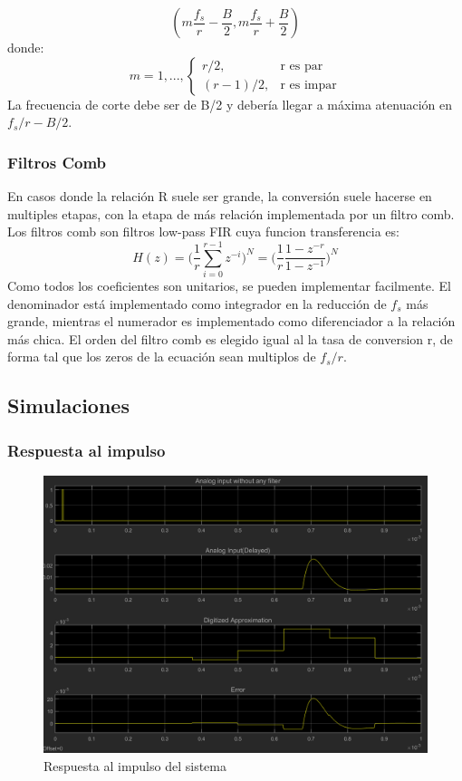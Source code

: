 \documentclass[assd_tp3_main.tex]{subfiles}
\begin{document}
\[ (m\frac{f_s}{r}-\frac{B}{2},m\frac{f_s}{r}+\frac{B}{2}) \]
donde:\\

\begin{equation}
    m = 1,...,
    \begin{cases}
      r/2, & \text{r es par} \\
      (r-1)/2, & \text{r es impar}
    \end{cases}
  \end{equation}
La frecuencia de corte debe ser de B/2 y debería llegar a máxima atenuación en $f_s/r-B/2$.
\subsubsection{Filtros Comb}
En casos donde la relación R suele ser grande, la conversión suele hacerse en multiples etapas, con la etapa de más relación implementada por un filtro comb.
Los filtros comb son filtros low-pass FIR cuya funcion transferencia es:
$$H(z)=\Bigg(\frac{1}{r}\sum_{i=0}^{r-1} z^{-i}\Bigg)^N = \Bigg(\frac{1}{r}\frac{1-z^{-r}}{1-z^{-1}}\Bigg)^N$$
Como todos los coeficientes son unitarios, se pueden implementar facilmente.
El denominador está implementado como integrador en la reducción de $f_s$ más grande, mientras el numerador es implementado como diferenciador a la relación más chica. El orden del filtro comb es elegido igual al la tasa de conversion r, de forma tal que los zeros de la ecuación sean multiplos de $f_s/r$.
\subsection{Simulaciones}
\subsubsection{Respuesta al impulso}
\begin{figure}[H]
\centering
\includegraphics[width=1\linewidth]{images/ej4/impulse_response.png}
\caption{Respuesta al impulso del sistema}
\label{fig:impulse_response}
\end{figure}
\end{document}
